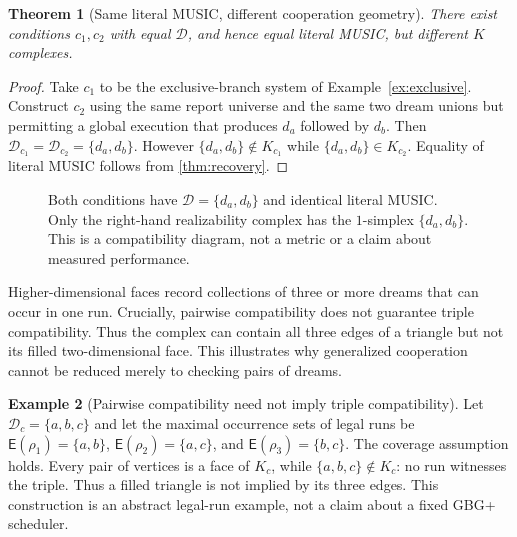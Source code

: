 \documentclass[11pt,letterpaper]{article}
\newtheorem{theorem}{Theorem}[section]
\theoremstyle{definition}
\newtheorem{example}[theorem]{Example}
\theoremstyle{remark}
\newcommand{\Dream}{\mathcal{D}}
\begin{document}
\begin{theorem}[Same literal MUSIC, different cooperation geometry]\label{thm:strict}
There exist conditions $c_1,c_2$ with equal $\Dream$, and hence equal literal MUSIC, but different $K$ complexes.
\end{theorem}
\begin{proof}
Take $c_1$ to be the exclusive-branch system of Example~\ref{ex:exclusive}. Construct $c_2$ using the same report universe and the same two dream unions but permitting a global execution that produces $d_a$ followed by $d_b$. Then $\Dream_{c_1}=\Dream_{c_2}=\{d_a,d_b\}$. However $\{d_a,d_b\}\notin K_{c_1}$ while $\{d_a,d_b\}\in K_{c_2}$. Equality of literal MUSIC follows from \cref{thm:recovery}.
\end{proof}

\begin{figure}[htbp]
\centering
{}
\caption{Both conditions have $\Dream=\{d_a,d_b\}$ and identical literal MUSIC. Only the right-hand realizability complex has the $1$-simplex $\{d_a,d_b\}$. This is a compatibility diagram, not a metric or a claim about measured performance.}
\label{fig:compat}
\end{figure}

Higher-dimensional faces record collections of three or more dreams that can occur in one run. Crucially, pairwise compatibility does not guarantee triple compatibility. Thus the complex can contain all three edges of a triangle but not its filled two-dimensional face. This illustrates why generalized cooperation cannot be reduced merely to checking pairs of dreams.


\begin{example}[Pairwise compatibility need not imply triple compatibility]\label{ex:triple}
Let $\Dream_c=\{a,b,c\}$ and let the maximal occurrence sets of legal runs be
$\mathsf E(\rho_1)=\{a,b\}$, $\mathsf E(\rho_2)=\{a,c\}$, and
$\mathsf E(\rho_3)=\{b,c\}$. The coverage assumption holds. Every pair of
vertices is a face of $K_c$, while $\{a,b,c\}\notin K_c$: no run witnesses the triple.
Thus a filled triangle is not implied by its three edges. This construction is an
abstract legal-run example, not a claim about a fixed GBG+ scheduler.
\end{example}
\end{document}
